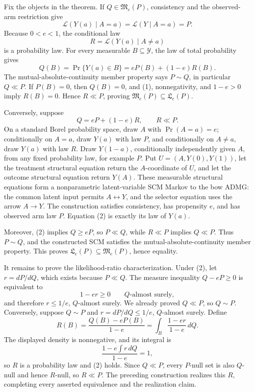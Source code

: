 Fix the objects in the theorem.  If \(Q\in\mathfrak M_e(P)\), consistency and the observed-arm restriction give
\[
 \mathcal L(Y(a)\mid A=a)=\mathcal L(Y\mid A=a)=P.
\]
Because \(0<e<1\), the conditional law
\[
 R=\mathcal L(Y(a)\mid A\ne a)
\]
is a probability law.  For every measurable \(B\subseteq\mathcal Y\), the law of total probability gives
\[
 Q(B)=\Pr\{Y(a)\in B\}=eP(B)+(1-e)R(B). \tag{1}
\]
The mutual-absolute-continuity member property says \(P\sim Q\), in particular \(Q\ll P\).  If \(P(B)=0\), then \(Q(B)=0\), and (1), nonnegativity, and \(1-e>0\) imply \(R(B)=0\).  Hence \(R\ll P\), proving \(\mathfrak M_e(P)\subseteq\mathfrak L_e(P)\).

Conversely, suppose
\[
 Q=eP+(1-e)R,\qquad R\ll P. \tag{2}
\]
On a standard Borel probability space, draw \(A\) with \(\Pr(A=a)=e\); conditionally on \(A=a\), draw \(Y(a)\) with law \(P\), and conditionally on \(A\ne a\), draw \(Y(a)\) with law \(R\).  Draw \(Y(1-a)\), conditionally independently given \(A\), from any fixed probability law, for example \(P\).  Put \(U=(A,Y(0),Y(1))\), let the treatment structural equation return the \(A\)-coordinate of \(U\), and let the outcome structural equation return \(Y(A)\).  These measurable structural equations form a nonparametric latent-variable SCM Markov to the bow ADMG: the common latent input permits \(A\leftrightarrow Y\), and the selector equation uses the arrow \(A\to Y\).  The construction satisfies consistency, has propensity \(e\), and has observed arm law \(P\).  Equation (2) is exactly its law of \(Y(a)\).

Moreover, (2) implies \(Q\ge eP\), so \(P\ll Q\), while \(R\ll P\) implies \(Q\ll P\).  Thus \(P\sim Q\), and the constructed SCM satisfies the mutual-absolute-continuity member property.  This proves \(\mathfrak L_e(P)\subseteq\mathfrak M_e(P)\), hence equality.

It remains to prove the likelihood-ratio characterization.  Under (2), let \(r=dP/dQ\), which exists because \(P\ll Q\).  The measure inequality \(Q-eP\ge0\) is equivalent to
\[
 1-er\ge0\qquad Q\text{-almost surely},
\]
and therefore \(r\le1/e\), \(Q\)-almost surely.  We already proved \(Q\ll P\), so \(Q\sim P\).  Conversely, suppose \(Q\sim P\) and \(r=dP/dQ\le1/e\), \(Q\)-almost surely.  Define
\[
 R(B)=\frac{Q(B)-eP(B)}{1-e}
     =\int_B\frac{1-er}{1-e}\,dQ.
\]
The displayed density is nonnegative, and its integral is
\[
 \frac{1-e\int r\,dQ}{1-e}=1,
\]
so \(R\) is a probability law and (2) holds.  Since \(Q\ll P\), every \(P\)-null set is also \(Q\)-null and hence \(R\)-null, so \(R\ll P\).  The preceding construction realizes this \(R\), completing every asserted equivalence and the realization claim.